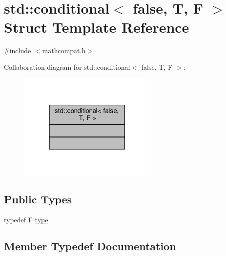 \hypertarget{structstd_1_1conditional_3_01false_00_01T_00_01F_01_4}{}\section{std\+:\+:conditional$<$ false, T, F $>$ Struct Template Reference}
\label{structstd_1_1conditional_3_01false_00_01T_00_01F_01_4}


{\ttfamily \#include $<$mathcompat.\+h$>$}



Collaboration diagram for std\+:\+:conditional$<$ false, T, F $>$\+:\nopagebreak
\begin{figure}[H]
\begin{center}
\leavevmode
\includegraphics[width=196pt]{d3/d6a/structstd_1_1conditional_3_01false_00_01T_00_01F_01_4__coll__graph}
\end{center}
\end{figure}
\subsection*{Public Types}
\begin{DoxyCompactItemize}
\item 
typedef F \hyperlink{structstd_1_1conditional_3_01false_00_01T_00_01F_01_4_a8307a0010d68b8c7f309a910bb6137fe}{type}
\end{DoxyCompactItemize}


\subsection{Member Typedef Documentation}
\mbox{\label{structstd_1_1conditional_3_01false_00_01T_00_01F_01_4_a8307a0010d68b8c7f309a910bb6137fe}} 
